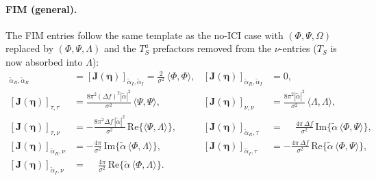 \documentclass[11pt]{article}
\begin{document}
\paragraph{FIM (general).} The FIM entries follow the same template as
the no-ICI case with \((\Phi,\Psi,\Omega)\) replaced by
\((\Phi,\Psi,\Lambda)\) and the \(T_S^a\) prefactors removed from the
\(\nu\)-entries (\(T_S\) is now absorbed into \(\Lambda\)):
\begin{align}
    [\bm{J}(\bm{\eta})]_{\tilde{\alpha}_R, \tilde{\alpha}_R} &=
        [\bm{J}(\bm{\eta})]_{\tilde{\alpha}_I, \tilde{\alpha}_I} =
        \tfrac{2}{\sigma^2}\,\langle \Phi,\Phi\rangle, &
    [\bm{J}(\bm{\eta})]_{\tilde{\alpha}_R, \tilde{\alpha}_I} &= 0, \\
    [\bm{J}(\bm{\eta})]_{\tau,\tau} &=
        \tfrac{8\pi^2 (\Delta f)^2 |\tilde{\alpha}|^2}{\sigma^2}\,
        \langle \Psi,\Psi\rangle, &
    [\bm{J}(\bm{\eta})]_{\nu,\nu} &=
        \tfrac{8\pi^2 |\tilde{\alpha}|^2}{\sigma^2}\,
        \langle \Lambda,\Lambda\rangle, \\
    [\bm{J}(\bm{\eta})]_{\tau,\nu} &=
        -\tfrac{8\pi^2 \Delta f\, |\tilde{\alpha}|^2}{\sigma^2}\,
        \text{Re}\{\langle \Psi,\Lambda\rangle\}, &
    [\bm{J}(\bm{\eta})]_{\tilde{\alpha}_R,\tau} &=
        \phantom{-}\tfrac{4\pi\,\Delta f}{\sigma^2}\,
        \text{Im}\{\tilde{\alpha}\,\langle \Phi,\Psi\rangle\}, \\
    [\bm{J}(\bm{\eta})]_{\tilde{\alpha}_R,\nu} &=
        -\tfrac{4\pi}{\sigma^2}\,
        \text{Im}\{\tilde{\alpha}\,\langle \Phi,\Lambda\rangle\}, &
    [\bm{J}(\bm{\eta})]_{\tilde{\alpha}_I,\tau} &=
        -\tfrac{4\pi\,\Delta f}{\sigma^2}\,
        \text{Re}\{\tilde{\alpha}\,\langle \Phi,\Psi\rangle\}, \\
    [\bm{J}(\bm{\eta})]_{\tilde{\alpha}_I,\nu} &=
        \phantom{-}\tfrac{4\pi}{\sigma^2}\,
        \text{Re}\{\tilde{\alpha}\,\langle \Phi,\Lambda\rangle\}. & &
\end{align}
\end{document}
